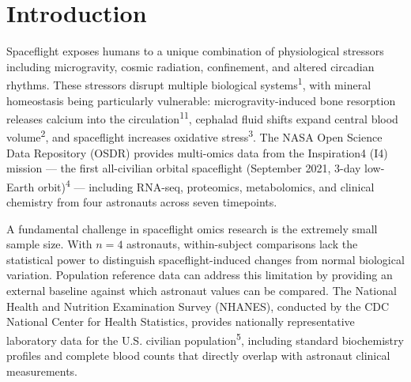 \documentclass[11pt,a4paper]{article}
\begin{document}
\section{Introduction}

Spaceflight exposes humans to a unique combination of physiological stressors including microgravity, cosmic radiation, confinement, and altered circadian rhythms. These stressors disrupt multiple biological systems\textsuperscript{1}, with mineral homeostasis being particularly vulnerable: microgravity-induced bone resorption releases calcium into the circulation\textsuperscript{11}, cephalad fluid shifts expand central blood volume\textsuperscript{2}, and spaceflight increases oxidative stress\textsuperscript{3}. The NASA Open Science Data Repository (OSDR) provides multi-omics data from the Inspiration4 (I4) mission --- the first all-civilian orbital spaceflight (September 2021, 3-day low-Earth orbit)\textsuperscript{4} --- including RNA-seq, proteomics, metabolomics, and clinical chemistry from four astronauts across seven timepoints.

A fundamental challenge in spaceflight omics research is the extremely small sample size. With $n=4$ astronauts, within-subject comparisons lack the statistical power to distinguish spaceflight-induced changes from normal biological variation. Population reference data can address this limitation by providing an external baseline against which astronaut values can be compared. The National Health and Nutrition Examination Survey (NHANES), conducted by the CDC National Center for Health Statistics, provides nationally representative laboratory data for the U.S. civilian population\textsuperscript{5}, including standard biochemistry profiles and complete blood counts that directly overlap with astronaut clinical measurements.
\end{document}
